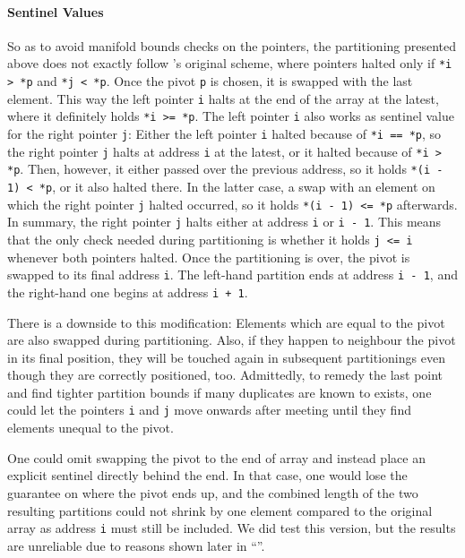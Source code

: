 \paragraph{Sentinel Values}
So as to avoid manifold bounds checks on the pointers, the partitioning presented above does not exactly follow \citeauthor{hoare1962quicksort}'s original scheme, where pointers halted only if \lstinline|*i > *p| and \lstinline|*j < *p|.
Once the pivot \lstinline|p| is chosen, it is swapped with the last element.
This way the left pointer \lstinline|i| halts at the end of the array at the latest, where it definitely holds \lstinline|*i >= *p|.
The left pointer \lstinline|i| also works as sentinel value for the right pointer \lstinline|j|:
Either the left pointer \lstinline|i| halted because of \lstinline|*i == *p|, so the right pointer \lstinline|j| halts at address \lstinline|i| at the latest, or it halted because of \lstinline|*i > *p|.
Then, however, it either passed over the previous address, so it holds \lstinline|*(i - 1) < *p|, or it also halted there.
In the latter case, a swap with an element on which the right pointer \lstinline|j| halted occurred, so it holds \lstinline|*(i - 1) <= *p| afterwards.
In summary, the right pointer \lstinline|j| halts either at address \lstinline|i| or \lstinline|i - 1|.
This means that the only check needed during partitioning is whether it holds \lstinline|j <= i| whenever both pointers halted.
Once the partitioning is over, the pivot is swapped to its final address \lstinline|i|.
The left-hand partition ends at address \lstinline|i - 1|, and the right-hand one begins at address \lstinline|i + 1|.

There is a downside to this modification:
Elements which are equal to the pivot are also swapped during partitioning.
Also, if they happen to neighbour the pivot in its final position, they will be touched again in subsequent partitionings even though they are correctly positioned, too.
Admittedly, to remedy the last point and find tighter partition bounds if many duplicates are known to exists, one could let the pointers \lstinline|i| and \lstinline|j| move onwards after meeting until they find elements unequal to the pivot.

One could omit swapping the pivot to the end of array and instead place an explicit sentinel directly behind the end.
In that case, one would lose the guarantee on where the pivot ends up, and the combined length of the two resulting partitions could not shrink by one element compared to the original array as address \lstinline|i| must still be included.
We did test this version, but the results are unreliable due to reasons shown later in \enquote{}.


